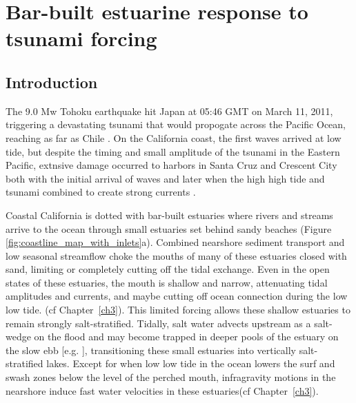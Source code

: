 \chapter{Bar-built estuarine response to tsunami forcing}
\label{chTsunami}




\section{Introduction}

The 9.0 Mw Tohoku earthquake hit Japan at 05:46 GMT on March 11, 2011,
triggering a devastating tsunami that would propogate across the Pacific
Ocean, reaching as far as Chile \parencite{mori_survey_2011,lagos_magnitude_2011}. On
the California coast, the first waves arrived at low tide, but despite
the timing and small amplitude of the tsunami in the Eastern Pacific,
extnsive damage occurred to harbors in Santa Cruz and Crescent City
both with the initial arrival of waves and later when the high high
tide and tsunami combined to create strong currents \parencite{wilson_observations_2012}.

Coastal California is dotted with bar-built estuaries where rivers
and streams arrive to the ocean through small estuaries set behind
sandy beaches (Figure \ref{fig:coastline_map_with_inlets}a). Combined
nearshore sediment transport and low seasonal streamflow choke the
mouths of many of these estuaries closed with sand, limiting or completely
cutting off the tidal exchange. Even in the open states of these estuaries,
the mouth is shallow and narrow, attenuating tidal amplitudes and
currents, and maybe cutting off ocean connection during the low low
tide. (cf Chapter~\ref{ch3}). This limited forcing allows
these shallow estuaries to remain strongly salt-stratified. Tidally,
salt water advects upstream as a salt-wedge on the flood and may become
trapped in deeper pools of the estuary on the slow ebb {[}e.g. \cite{largier_dynamics_1991,ranasinghe_circulation_1999}{]},
transitioning these small estuaries into vertically salt-stratified
lakes. Except for when low low tide in the ocean lowers the surf and
swash zones below the level of the perched mouth, infragravity motions
in the nearshore induce fast water velocities in these estuaries(cf Chapter~\ref{ch3}). 



